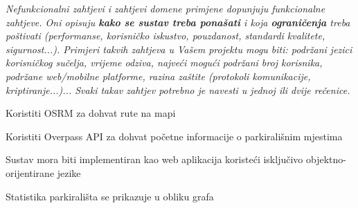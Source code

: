 			 \textit{Nefunkcionalni zahtjevi i zahtjevi domene primjene dopunjuju funkcionalne zahtjeve. Oni opisuju \textbf{kako se sustav treba ponašati} i koja \textbf{ograničenja} treba poštivati (performanse, korisničko iskustvo, pouzdanost, standardi kvalitete, sigurnost...). Primjeri takvih zahtjeva u Vašem projektu mogu biti: podržani jezici korisničkog sučelja, vrijeme odziva, najveći mogući podržani broj korisnika, podržane web/mobilne platforme, razina zaštite (protokoli komunikacije, kriptiranje...)... Svaki takav zahtjev potrebno je navesti u jednoj ili dvije rečenice.}
			 \begin{packed_enum}

				\item Koristiti OSRM za dohvat rute na mapi
				\item Koristiti Overpass API za dohvat početne informacije o parkirališnim mjestima
				\item Sustav mora biti implementiran kao web aplikacija koristeći isključivo objektno-orijentirane jezike
				\item Statistika parkirališta se prikazuje u obliku grafa
				
			 \end{packed_enum}
			 
			 